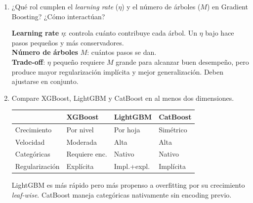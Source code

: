 \documentclass[11pt,a4paper]{article}
\begin{document}
\begin{enumerate}[label=\textbf{P\arabic*.}, resume]
\begin{answerbox}
Los \textbf{pseudo-residuos} son el gradiente negativo de la funci\'on de p\'erdida
respecto de la predicci\'on actual:
\[
  r_{im} = -\frac{\partial L(y_i, F(x_i))}{\partial F(x_i)}\bigg|_{F=F_{m-1}}
\]
Cada \'arbol nuevo se entrena para \textbf{predecir estos residuos}, lo que equivale
a dar un paso en la direcci\'on de mayor descenso de la p\'erdida en el espacio
funcional. Para MSE, el pseudo-residuo es simplemente $y_i - \hat{y}_i$.
\end{answerbox}

\item ¿Qu\'e rol cumplen el \textit{learning rate} ($\eta$) y el n\'umero de \'arboles
  ($M$) en Gradient Boosting? ¿C\'omo interact\'uan?

\begin{answerbox}
\textbf{Learning rate} $\eta$: controla cu\'anto contribuye cada \'arbol. Un $\eta$ bajo
hace pasos peque\~nos y m\'as conservadores.\\
\textbf{N\'umero de \'arboles} $M$: cu\'antos pasos se dan.\\[4pt]
\textbf{Trade-off}: $\eta$ peque\~no requiere $M$ grande para alcanzar buen desempe\~no,
pero produce mayor regularizaci\'on impl\'icita y mejor generalizaci\'on. Deben
ajustarse en conjunto.
\end{answerbox}

\item Compare XGBoost, LightGBM y CatBoost en al menos dos dimensiones.

\begin{answerbox}
\begin{center}
\begin{tabular}{llll}
\toprule
& \textbf{XGBoost} & \textbf{LightGBM} & \textbf{CatBoost}\\
\midrule
Crecimiento & Por nivel & Por hoja & Sim\'etrico\\
Velocidad & Moderada & Alta & Alta\\
Categ\'oricas & Requiere enc. & Nativo & Nativo\\
Regularizaci\'on & Expl\'icita & Impl.+expl. & Impl\'icita\\
\bottomrule
\end{tabular}
\end{center}
LightGBM es m\'as r\'apido pero m\'as propenso a overfitting por su crecimiento
\textit{leaf-wise}. CatBoost maneja categ\'oricas nativamente sin encoding previo.
\end{answerbox}

\end{enumerate}
\end{document}
